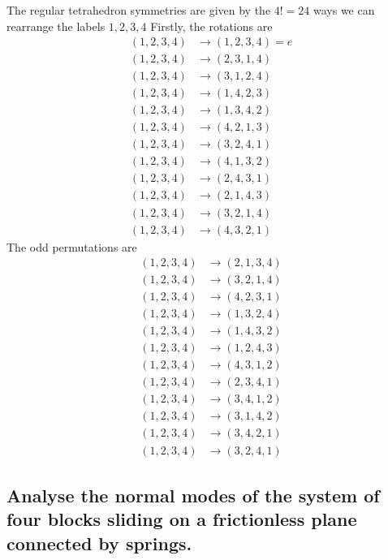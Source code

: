 \documentclass[main.tex]{subfiles}
\begin{document}
\begin{figure}[H] 
\centering
\end{figure}
The regular tetrahedron symmetries are given by the $4!=24$ ways we can rearrange the labels $1,2,3,4$
Firstly, the rotations are 
\begin{align}
(1,2,3,4)&\rightarrow(1,2,3,4) = e\\
(1,2,3,4)&\rightarrow(2,3,1,4)\\
(1,2,3,4)&\rightarrow(3,1,2,4)\\
(1,2,3,4)&\rightarrow(1,4,2,3)\\
(1,2,3,4)&\rightarrow(1,3,4,2)\\
(1,2,3,4)&\rightarrow(4,2,1,3)\\
(1,2,3,4)&\rightarrow(3,2,4,1)\\
(1,2,3,4)&\rightarrow(4,1,3,2)\\
(1,2,3,4)&\rightarrow(2,4,3,1)\\
(1,2,3,4)&\rightarrow(2,1,4,3)\\
(1,2,3,4)&\rightarrow(3,2,1,4)\\
(1,2,3,4)&\rightarrow(4,3,2,1)
\end{align}
The odd permutations are 
\begin{align}
(1,2,3,4)&\rightarrow(2,1,3,4)\\
(1,2,3,4)&\rightarrow(3,2,1,4)\\
(1,2,3,4)&\rightarrow(4,2,3,1)\\
(1,2,3,4)&\rightarrow(1,3,2,4)\\
(1,2,3,4)&\rightarrow(1,4,3,2)\\
(1,2,3,4)&\rightarrow(1,2,4,3)\\
(1,2,3,4)&\rightarrow(4,3,1,2)\\
(1,2,3,4)&\rightarrow(2,3,4,1)\\
(1,2,3,4)&\rightarrow(3,4,1,2)\\
(1,2,3,4)&\rightarrow(3,1,4,2)\\
(1,2,3,4)&\rightarrow(3,4,2,1)\\
(1,2,3,4)&\rightarrow(3,2,4,1)
\end{align}
\subsection{Analyse the normal modes of the system of four blocks sliding on a frictionless plane connected by springs.}
\end{document}
